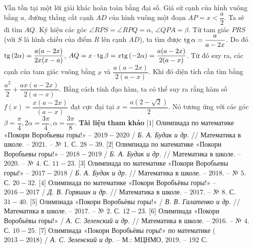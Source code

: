 \begin{multicols}{2}
	Vẫn tồn tại một lời giải khác hoàn toàn bằng đại số. Giả sử cạnh của hình vuông bằng $a$, đường thẳng cắt cạnh $AD$ của hình vuông một đoạn  $AP = x < \dfrac{a}{2}$. Ta sẽ đi tìm $AQ$. Ký hiệu các góc $\angle RPS = \angle RPQ = \alpha $, $\angle QPA = \beta$. Từ tam giác $PRS$ (với $S$ là hình chiếu của điểm $R$ lên cạnh $AD$), ta tìm được ${\rm{tg}}\,\alpha  = \dfrac{a}{{a - 2x}}$. Do đó  ${\rm{tg}}\,(2\alpha ) = \dfrac{{a(a - 2x)}}{{2x(x - a)}}$,  $AQ = x \cdot {\rm{tg}}\,\beta  = x{\rm{tg}}\,( - 2\alpha ) = \dfrac{{a(a - 2x)}}{{2(a - x)}}$.
	\vskip 0.1cm
	Từ đó suy ra, các cạnh của tam giác vuông bằng $x$ và  $\dfrac{{a(a - 2x)}}{{2(a - x)}}$. Khi đó diện tích cần tìm bằng $\dfrac{{{a^2}}}{2} + \dfrac{{ax(a - 2x)}}{{2(a - x)}}$. Bằng cách tính đạo hàm, ta có thể suy ra rằng hàm số $f(x) = \dfrac{{x(a - 2x)}}{{(a - x)}}$  đạt cực đại tại  $x = \dfrac{{a(2 - \sqrt 2 )}}{2}$. Nó tương ứng với các góc  $\beta = \dfrac{\pi}{4}, 2\alpha = \dfrac{3\pi}{4}, \alpha = \dfrac{3\pi}{8}$.
	\vskip 0.1cm
	\textbf{\color{cackithi}Tài liệu tham khảo}
	\vskip 0.1cm
	[$1$] Олимпиада по математике «Покори Воробьевы горы!» -- $2019-2020$ / \textit{Б. А. Будак и др.} // Математика в школе. -- $2021$. -- № 1. С. $28 - 39$.
	\vskip 0.1cm
	[$2$] Олимпиада по математике «Покори Воробьевы горы!» -- $2018-2019$ / \textit{Б. А. Будак и др.} // Математика в школе. -- $2020$. -- № $4$. С. $11 - 23$.
	\vskip 0.1cm
	[$3$] Олимпиада по математике «Покори Воробьевы горы!» -- $2017-2018$ / \textit{Б. А. Будак и др.} // Математика в школе. -- $2018$. -- № $5$. С. $20 - 32$.
	\vskip 0.1cm
	[$4$] Олимпиада по математике «Покори Воробьёвы горы!» -- $2016-2017$ / \textit{Д. В. Горяшин и др.} // Математика в школе. -- $2017$. -- № 8. $С$. $31- 40$.
	\vskip 0.1cm
	[$5$] Олимпиада «Покори Воробьёвы горы!» / \textit{В. В. Галатенко и др.} // Математика в школе. -- $2017$. -- № $2$. С. $12 - 23$.
	\vskip 0.1cm
	[$6$] Олимпиада «Покори Воробьёвы горы!» / \textit{А. С. Зеленский и др.} // Математика в школе. -- $2016$. -- № $4$. С. $10 - 25$.
	\vskip 0.1cm
	[$7$] Олимпиада «Покори Воробьёвы горы!» по математике ($2013 - 2018$) / \textit{А. С. Зеленский и др.} -- М.: МЦНМО, $2019$. -- $192$ С. 
\end{multicols}